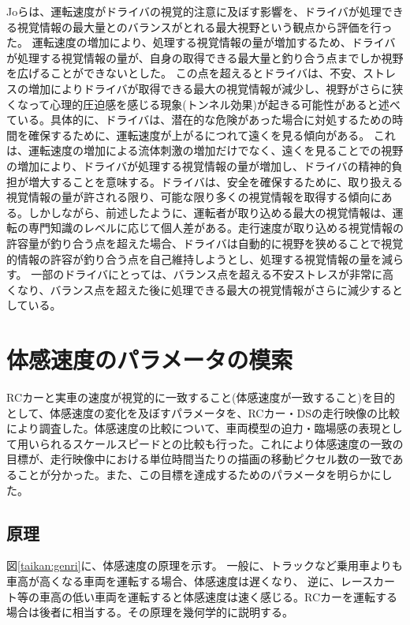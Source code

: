 Joら\cite{taikan:jo}は、運転速度がドライバの視覚的注意に及ぼす影響を、ドライバが処理できる視覚情報の最大量とのバランスがとれる最大視野という観点から評価を行った。
運転速度の増加により、処理する視覚情報の量が増加するため、ドライバが処理する視覚情報の量が、自身の取得できる最大量と釣り合う点までしか視野を広げることができないとした。
この点を超えるとドライバは、不安、ストレスの増加によりドライバが取得できる最大の視覚情報が減少し、視野がさらに狭くなって心理的圧迫感を感じる現象(トンネル効果)が起きる可能性があると述べている。具体的に、ドライバは、潜在的な危険があった場合に対処するための時間を確保するために、運転速度が上がるにつれて遠くを見る傾向がある。 これは、運転速度の増加による流体刺激の増加だけでなく、遠くを見ることでの視野の増加により、ドライバが処理する視覚情報の量が増加し、ドライバの精神的負担が増大することを意味する。ドライバは、安全を確保するために、取り扱える視覚情報の量が許される限り、可能な限り多くの視覚情報を取得する傾向にある。しかしながら、前述したように、運転者が取り込める最大の視覚情報は、運転の専門知識のレベルに応じて個人差がある。走行速度が取り込める視覚情報の許容量が釣り合う点を超えた場合、ドライバは自動的に視野を狭めることで視覚的情報の許容が釣り合う点を自己維持しようとし、処理する視覚情報の量を減らす。
一部のドライバにとっては、バランス点を超える不安ストレスが非常に高くなり、バランス点を超えた後に処理できる最大の視覚情報がさらに減少するとしている。

\section{体感速度のパラメータの模索}
RCカーと実車の速度が視覚的に一致すること(体感速度が一致すること)を目的として、体感速度の変化を及ぼすパラメータを、RCカー・DSの走行映像の比較により調査した。体感速度の比較について、車両模型の迫力・臨場感の表現として用いられるスケールスピードとの比較も行った。これにより体感速度の一致の目標が、走行映像中における単位時間当たりの描画の移動ピクセル数の一致であることが分かった。また、この目標を達成するためのパラメータを明らかにした。

\subsection{原理}
図\ref{taikan:genri}に、体感速度の原理を示す。
一般に、トラックなど乗用車よりも車高が高くなる車両を運転する場合、体感速度は遅くなり、
逆に、レースカート等の車高の低い車両を運転すると体感速度は速く感じる。RCカーを運転する場合は後者に相当する。その原理を幾何学的に説明する。

